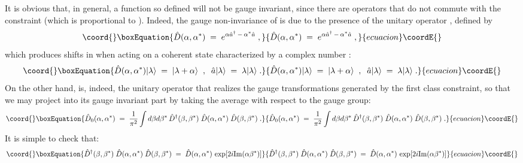 \documentclass[a4paper,12pt]{article}
\begin{document}
It is obvious that, in general, a function so defined will not be
gauge invariant, since there are operators that do not commute with
the constraint (which is proportional to \coordHE{}).  Indeed, the
gauge non-invariance of \coordHE{} is due to the presence of the unitary
operator \coordHE{}, defined by
\begin{equation}\coord{}\boxEquation{
  \label{defu}
{\hat D}(\alpha,\alpha^*) \;=\; e^{\alpha {\hat a}^\dagger \,-\,
\alpha^* {\hat a}} 
\;,
}{
  {\hat D}(\alpha,\alpha^*) \;=\; e^{\alpha {\hat a}^\dagger \,-\,
\alpha^* {\hat a}} 
\;,
}{ecuacion}\coordE{}\end{equation}
which produces shifts in \myHighlight{$\alpha$}\coordHE{} when acting on a coherent state
characterized by a complex number \myHighlight{$\lambda$}\coordHE{}:
\begin{equation}\coord{}\boxEquation{
  \label{eq:actu}
{\hat D}(\alpha,\alpha^*) |\lambda\rangle \;=\; |\lambda + \alpha
\rangle \;\;,\;\;
{\hat a} |\lambda \rangle \;=\; \lambda |\lambda \rangle \;.
}{
  {\hat D}(\alpha,\alpha^*) |\lambda\rangle \;=\; |\lambda + \alpha
\rangle \;\;,\;\;
{\hat a} |\lambda \rangle \;=\; \lambda |\lambda \rangle \;.
}{ecuacion}\coordE{}\end{equation}
On the other hand, \coordHE{} is, indeed, the
unitary operator
that realizes the gauge transformations generated by the first
class
constraint, so that we may project \coordHE{} into
its gauge
invariant part by taking the average with respect to the gauge
group:
\begin{equation}\coord{}\boxEquation{
  \label{eq:gruav}
{\hat D}_0 (\alpha,\alpha^*) \;=\;\frac{1}{\pi^2} \int d\beta
d\beta^* \,
{\hat D}^\dagger (\beta,\beta^*)\;{\hat D}(\alpha,\alpha^*)\;{\hat
D}(\beta,\beta^*)\;. 
}{
  {\hat D}_0 (\alpha,\alpha^*) \;=\;\frac{1}{\pi^2} \int d\beta
d\beta^* \,
{\hat D}^\dagger (\beta,\beta^*)\;{\hat D}(\alpha,\alpha^*)\;{\hat
D}(\beta,\beta^*)\;. 
}{ecuacion}\coordE{}\end{equation}
It is simple to check that:
\begin{equation}\coord{}\boxEquation{
  \label{eq:crule}
{\hat D}^\dagger (\beta,\beta^*)\;{\hat D}(\alpha,\alpha^*)\;{\hat
D}(\beta,\beta^*)
\;=\;{\hat D}(\alpha,\alpha^*) \, \exp[2 i {\rm Im}(\alpha
\beta^*)] 
}{
  {\hat D}^\dagger (\beta,\beta^*)\;{\hat D}(\alpha,\alpha^*)\;{\hat
D}(\beta,\beta^*)
\;=\;{\hat D}(\alpha,\alpha^*) \, \exp[2 i {\rm Im}(\alpha
\beta^*)] 
}{ecuacion}\coordE{}\end{equation}
\end{document}
